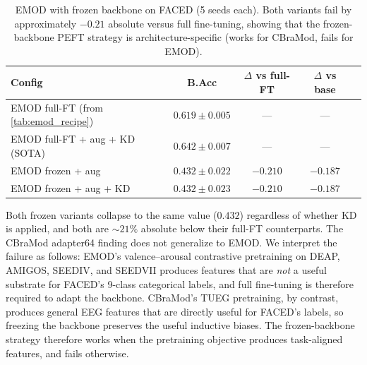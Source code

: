 \begin{table}[!h]
\caption{EMOD with frozen backbone on FACED (5 seeds each). Both variants fail by approximately $-0.21$ absolute versus full fine-tuning, showing that the frozen-backbone PEFT strategy is architecture-specific (works for CBraMod, fails for EMOD).}
\small
\centering
\begin{tabular}{lcccc}
\toprule
Config & B.Acc & $\Delta$ vs full-FT & $\Delta$ vs base \\
\midrule
EMOD full-FT (from \cref{tab:emod_recipe}) & $0.619 \pm 0.005$ & --- & --- \\
EMOD full-FT + aug + KD (SOTA) & $0.642 \pm 0.007$ & --- & --- \\
\midrule
EMOD frozen + aug & $0.432 \pm 0.022$ & $-0.210$ & $-0.187$ \\
EMOD frozen + aug + KD & $0.432 \pm 0.023$ & $-0.210$ & $-0.187$ \\
\bottomrule
\end{tabular}
\label{tab:supp_emod_frozen}
\end{table}

Both frozen variants collapse to the same value ($0.432$) regardless of whether KD is applied, and both are $\sim 21\%$ absolute below their full-FT counterparts. The CBraMod adapter64 finding does not generalize to EMOD. We interpret the failure as follows: EMOD's valence--arousal contrastive pretraining on DEAP, AMIGOS, SEEDIV, and SEEDVII produces features that are \emph{not} a useful substrate for FACED's 9-class categorical labels, and full fine-tuning is therefore required to adapt the backbone. CBraMod's TUEG pretraining, by contrast, produces general EEG features that are directly useful for FACED's labels, so freezing the backbone preserves the useful inductive biases. The frozen-backbone strategy therefore works when the pretraining objective produces task-aligned features, and fails otherwise.
